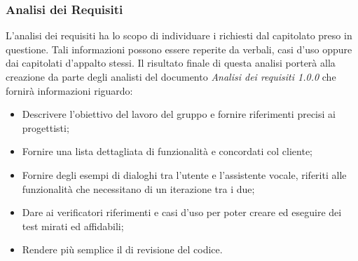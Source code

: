 \subsubsection{Analisi dei Requisiti}
L’analisi dei requisiti ha lo scopo di individuare i  richiesti dal capitolato preso in questione. Tali informazioni possono essere reperite da verbali, casi d’uso oppure dai capitolati d’appalto stessi. Il risultato finale di questa analisi porterà alla creazione da parte degli analisti del documento \emph{Analisi dei requisiti 1.0.0} che fornirà informazioni riguardo:
\begin{itemize}
	\item Descrivere l’obiettivo del lavoro del gruppo e fornire riferimenti precisi ai progettisti;
	\item Fornire una lista dettagliata di funzionalità e  concordati col  cliente;
	\item Fornire degli esempi di dialoghi tra l'utente e l'assistente vocale, riferiti alle funzionalità che necessitano di un iterazione tra i due;
	\item Dare ai verificatori riferimenti e casi d’uso per poter creare ed eseguire dei test mirati ed affidabili;
	\item Rendere più semplice il  di revisione del codice.
\end{itemize}
